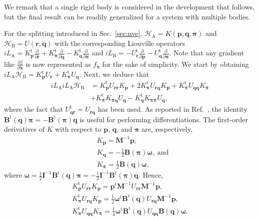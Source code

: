 \documentclass[
	aip,
	jcp,
	reprint,
]{revtex4-1}
\newcommand{\mt}[1]{\boldsymbol{\mathbf{#1}}}          %
\newcommand{\vt}[1]{\boldsymbol{\mathbf{#1}}}          %
\newcommand{\tr}[1]{#1^\text{t}}                       %
\newcommand{\diff}[2]{\frac{\partial #1}{\partial #2}} %
\newcommand{\Ham}[1]{{\mathcal H}_\text{#1}}           %
\newcommand{\Liu}[1]{i\!L_\text{#1}}                   %
\begin{document}
We remark that a single rigid body is considered in the development that follows, but the final result can be readily generalized for a system with multiple bodies.

For the splitting introduced in Sec.~\ref{sec:nve}, $\Ham A = K(\vt p, \vt q, \vt \pi)$ and $\Ham B = U(\vt r, \vt q)$ with the corresponding Liouville operators $\Liu{A} = \tr{K_{\vt p}}\diff{}{\vt r} + \tr{K_{\vt \pi}}\diff{}{\vt q} - \tr{K_{\vt q}}\diff{}{\vt \pi}$ and $\Liu{B} = -\tr{U_{\vt r}}\diff{}{\vt p} - \tr{U_{\vt q}}\diff{}{\vt \pi}$.
Note that any gradient like $\diff{f}{\vt x}$ is now represented as $f_{\vt x}$ for the sake of simplicity.
We start by obtaining $\Liu A \Ham B = \tr{K_{\vt p}} U_{\vt r} + \tr{K_{\vt \pi}} U_{\vt q}$. Next, we deduce that
\begin{align*}
\Liu A \Liu A \Ham B &= \tr{K_{\vt p}} U_{\vt r \vt r} K_{\vt p}
+ 2 \tr{K_{\vt \pi}} U_{\vt r \vt q} K_{\vt p}
+ \tr{K_{\vt \pi}} U_{\vt q \vt q} K_{\vt \pi} \\
&+ \tr{K_{\vt \pi}} K_{\vt \pi \vt q} U_{\vt q}
- \tr{K_{\vt q}} K_{\vt \pi \vt \pi} U_{\vt q},
\end{align*}
where the fact that $\tr{U_{\vt q \vt r}} = U_{\vt r \vt q}$ has been used.
As reported in Ref.~, the identity $\tr{\mt B}(\vt q) {\vt \pi} = -\tr{\mt B}(\vt \pi) {\vt q}$ is useful for performing differentiations.
The first-order derivatives of $K$ with respect to $\vt p$, $\vt q$, and $\vt \pi$ are, respectively,
\begin{align*}
&K_{\vt p} = {\mt M}^{-1} {\vt p}, \\
&K_{\vt q} = -\frac{1}{2} {\mt B}(\vt \pi) {\vt \omega}, \; \text{and} \\
&K_{\vt \pi} = \frac{1}{2} {\mt B}(\vt q) {\vt \omega},
\end{align*}
where $\vt \omega = \frac{1}{2} {\mt I}^{-1} \tr{\mt B}(\vt q) \vt \pi = -\frac{1}{2} {\mt I}^{-1} \tr{\mt B}(\vt \pi) \vt q$.\cite{Silveira_2017} Hence,
\begin{gather*}
\tr{K_{\vt p}} U_{\vt r \vt r} K_{\vt p} = \tr{\vt p} {\mt M}^{-1} U_{\vt r \vt r} {\mt M}^{-1} {\vt p}, \\
\tr{K_{\vt \pi}} U_{\vt r \vt q} K_{\vt p} = \frac{1}{2} \tr{\vt \omega} \tr{\mt B}(\vt q) U_{\vt r \vt q} {\mt M}^{-1} {\vt p}, \\
\tr{K_{\vt \pi}} U_{\vt q \vt q} K_{\vt \pi} = \frac{1}{4} \tr{\vt \omega} \tr{\mt B}(\vt q) U_{\vt q \vt q} {\mt B}(\vt q) \vt \omega.
\end{gather*}
\end{document}
